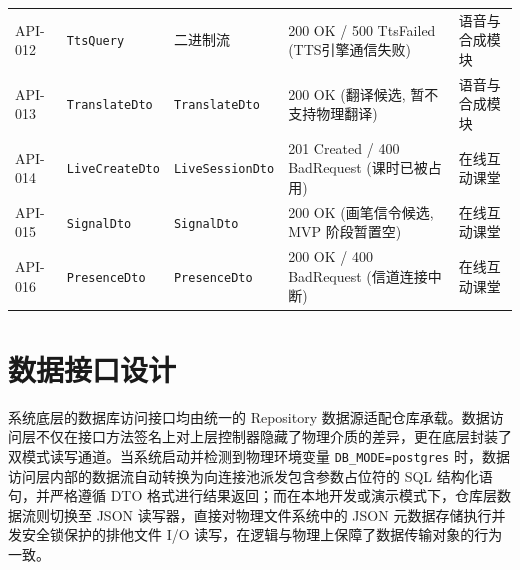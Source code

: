 \begin{longtable}{@{}p{1.25cm} p{2.45cm} p{2.55cm} p{4.2cm} p{2.4cm}@{}}
API-012 & \texttt{Tts\allowbreak Query} & 二进制流 & 200 OK / 500 TtsFailed (TTS引擎通信失败) & 语音与合成模块 \\
API-013 & \texttt{Translate\allowbreak Dto} & \texttt{Translate\allowbreak Dto} & 200 OK (翻译候选, 暂不支持物理翻译) & 语音与合成模块 \\
API-014 & \texttt{Live\allowbreak Create\allowbreak Dto} & \texttt{Live\allowbreak Session\allowbreak Dto} & 201 Created / 400 BadRequest (课时已被占用) & 在线互动课堂 \\
API-015 & \texttt{Signal\allowbreak Dto} & \texttt{Signal\allowbreak Dto} & 200 OK (画笔信令候选, MVP 阶段暂置空) & 在线互动课堂 \\
API-016 & \texttt{Presence\allowbreak Dto} & \texttt{Presence\allowbreak Dto} & 200 OK / 400 BadRequest (信道连接中断) & 在线互动课堂 \\
\end{longtable}
\endgroup

\section{数据接口设计}
系统底层的数据库访问接口均由统一的 Repository 数据源适配仓库承载。数据访问层不仅在接口方法签名上对上层控制器隐藏了物理介质的差异，更在底层封装了双模式读写通道。当系统启动并检测到物理环境变量 \texttt{DB\_MODE=postgres} 时，数据访问层内部的数据流自动转换为向连接池派发包含参数占位符的 SQL 结构化语句，并严格遵循 DTO 格式进行结果返回；而在本地开发或演示模式下，仓库层数据流则切换至 JSON 读写器，直接对物理文件系统中的 JSON 元数据存储执行并发安全锁保护的排他文件 I/O 读写，在逻辑与物理上保障了数据传输对象的行为一致。
